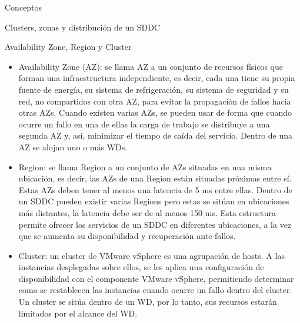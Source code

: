\begin{section}{Conceptos}
\begin{subsection}{Clusters, zonas y distribución de un SDDC}
\begin{subsubsection}{Availability Zone, Region y Cluster}
\begin{itemize}
  \item Availability Zone (AZ): se llama AZ a un conjunto de recursos físicos que forman una infraestructura independiente, es decir, cada una tiene su propia fuente de energía, su sistema de refrigeración, su sistema de seguridad y su red, no compartidos con otra AZ, para evitar la propagación de fallos hacia otras AZs. Cuando existen varias AZs, se pueden usar de forma que cuando ocurre un fallo en una de ellas la carga de trabajo se distribuye a una segunda AZ y, así, minimizar el tiempo de caída del servicio. Dentro de una AZ se alojan uno o más WDs.
  
  \item Region: se llama Region a un conjunto de AZs situadas en una misma ubicación, es decir, las AZs de una Region están situadas próximas entre sí. Estas AZs deben tener al menos una latencia de 5 ms entre ellas. Dentro de un SDDC pueden existir varias Regions pero estas se sitúan en ubicaciones más distantes, la latencia debe ser de al menos 150 ms. Esta estructura permite ofrecer los servicios de un SDDC en diferentes ubicaciones, a la vez que se aumenta su disponibilidad y recuperación ante fallos.
  
  \item Cluster: un cluster de VMware vSphere es una agrupación de hosts. A las instancias desplegadas sobre ellos, se les aplica una configuración de disponibilidad con el componente VMware vSphere, permitiendo determinar como se restablecen las instancias cuando ocurre un fallo dentro del cluster. Un cluster se sitúa dentro de un WD, por lo tanto, sus recursos estarán limitados por el alcance del WD. 
\end{itemize} 


\end{subsubsection}
\end{subsection}
\end{section}
